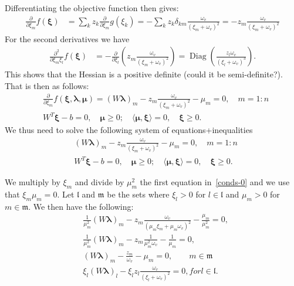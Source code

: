 \documentclass[12pt]{amsart}
\theoremstyle{definition}
\begin{document}
Differentiating the objective function then gives:
\begin{equation}\label{grad-o}
\begin{aligned}
    \frac{\partial }{\partial \xi_m}f(\bm{\xi})&=\sum_{k} z_{k}\frac{\partial  }{\partial \xi_m}g(\xi_k)
    =-\sum_{k} z_{k}\delta_{km}\frac{\omega_v}{(\xi_m+\omega_v)^2}
    =-z_{m}\frac{\omega_v}{(\xi_m+\omega_v)^2}
\end{aligned}
\end{equation}
For the second derivatives we have
\begin{equation}\label{hessian-o}
\begin{aligned}
    \frac{\partial^2 }{\partial \xi_m\xi_l}f(\bm{\xi})&=
    -    \frac{\partial }{\partial \xi_l}\left(z_{m}\frac{\omega_v}{(\xi_m+\omega_v)^2}\right)
    =\operatorname{Diag}\left(\frac{z_l\omega_v}{(\xi_l+\omega_v)^3}\right).
\end{aligned}
\end{equation}
This shows that the Hessian is a positive definite {\color{red}(could it be semi-definite?)}. That is then as follows:
\begin{equation}
\begin{aligned}
    &\frac{\partial }{\partial \xi_m}f(\bm{\xi},\bm{\lambda},\bm{\mu})=
    (W\bm{\lambda})_m-z_{m}\frac{\omega_v}{(\xi_m+\omega_v)^2}-\mu_m
    =0, \quad m=1:n\\
    &W^T\bm{\xi}-b =0, \quad
    \bm\mu \ge 0; \quad \langle\bm\mu,\bm \xi\rangle =0 ,\quad \bm{\xi}\ge 0.
\end{aligned}
\end{equation}
We thus need to solve the following system of equations+inequalities
\begin{equation}\label{conds-0}
\begin{aligned}
    &(W\bm{\lambda})_m-z_{m}\frac{\omega_v}{(\xi_m+\omega_v)^2}-\mu_m=0, \quad m=1:n\\
    &W^T\bm{\xi}-b =0, \quad
    \bm\mu \ge 0; \quad \langle\bm\mu,\bm \xi\rangle =0 ,\quad \bm{\xi}\ge 0.
\end{aligned}
\end{equation}

We multiply by $\xi_m$ and divide by $\mu_m^2$ the first equation in~\eqref{conds-0} and we use that $\xi_m\mu_m=0$. Let $\mathfrak{l}$ and $\mathfrak{m}$ 
be the sets where $\xi_l>0$ for $l\in \mathfrak{l}$ and $\mu_m>0$ for $m\in\mathfrak{m}$. We then have the following:
\begin{equation}\label{conds-10}
\begin{aligned}
    &\frac{1}{\mu_m^2}(W\bm{\lambda})_m-z_{m}\frac{\omega_v}{(\mu_m\xi_m+\mu_m\omega_v)^2}-\frac{\mu_m}{\mu_m^2}=0,\\
    &\frac{1}{\mu_m^2}(W\bm{\lambda})_m-z_{m}\frac{1}{\mu_m^2\omega_v}-\frac{1}{\mu_m}=0,\\
    &(W\bm{\lambda})_m-\frac{z_{m}}{\omega_v}-\mu_m=0,\qquad m\in\mathfrak{m}\\
    &\xi_l(W\bm{\lambda})_l-\xi_l z_{l}\frac{\omega_v}{(\xi_l+\omega_v)^2}=0, for l \in \mathfrak{l}.
\end{aligned}
\end{equation}
\end{document}
